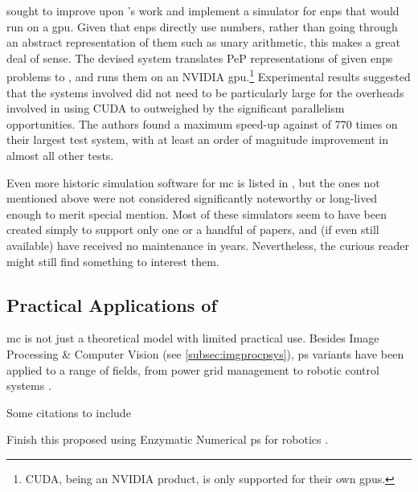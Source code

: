 \citeauthor{Raghavan2020} \cite{Raghavan2020} sought to improve upon \citeauthor{Florea2018}'s work \cite{Florea2018} and implement a simulator for \gls{enps} that would run on a \gls{gpu}.  Given that \gls{enps} directly use numbers, rather than going through an abstract representation of them such as unary arithmetic, this makes a great deal of sense.  The devised system translates PeP representations of given \gls{enps} problems to , and runs them on an NVIDIA \gls{gpu}.\footnote{CUDA, being an NVIDIA product, is only supported for their own \glspl{gpu}.}  Experimental results suggested that the systems involved did not need to be particularly large for the overheads involved in using CUDA to outweighed by the significant parallelism opportunities.  The authors found a maximum speed-up against \cite{Florea2018} of 770 times on their largest test system, with at least an order of magnitude improvement in almost all other tests.

Even more historic simulation software for \gls{mc} is listed in \cite{Raghavan2016}, but the ones not mentioned above were not considered significantly noteworthy or long-lived enough to merit special mention.  Most of these simulators seem to have been created simply to support only one or a handful of papers, and (if even still available) have received no maintenance in years.  Nevertheless, the curious reader might still find something to interest them.


\subsection{\label{sec:psystemsuses}Practical Applications of }
\Gls{mc} is not just a theoretical model with limited practical use.  Besides Image Processing \& Computer Vision (see \vref{subsec:imgprocpsys}), \gls{ps} variants have been applied to a range of fields, from power grid management to robotic control systems \cite{Zhang2017}.

\begin{anfxwarning}{Some citations to include}
\cite{Zhang2020,Colomer2010,Gheorghe2010,Liu2016,Huang2016,Perez-Hurtado2010,Verlan2012,Syropoulos2004,Liu2020,Lefticaru2011,Oltean2008}
\end{anfxwarning}

\begin{anfxerror}{Finish this}
\citeauthor{Florea2017} proposed using Enzymatic Numerical \gls{ps} for robotics \cite{Florea2017,Florea2016,Florea2017a,Florea2019,Florea2016a}.
\end{anfxerror}


